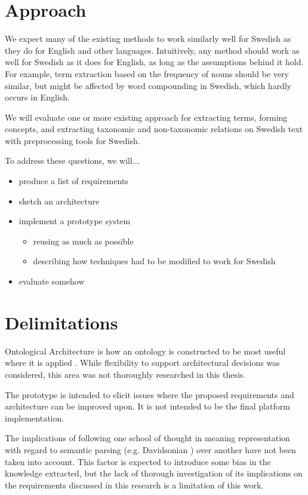 \documentclass[a4paper]{report}
\begin{document}
\section{Approach}

We expect many of the existing methods to work similarly well for Swedish as they do for English and other languages.
Intuitively, any method should work as well for Swedish as it does for English, as long as the assumptions behind it hold.
For example, term extraction based on the frequency of nouns should be very similar, but might be affected by word compounding in Swedish, which hardly occurs in English.

We will evaluate one or more existing approach for extracting terms, forming concepts, and extracting taxonomic and non-taxonomic relations on Swedish text with preprocessing tools for Swedish.


To address these questions, we will...

\begin{itemize}
  \item produce a list of requirements
  \item sketch an architecture
  \item implement a prototype system
    \begin{itemize}
      \item reusing as much as possible
      \item describing how techniques had to be modified to work for Swedish
    \end{itemize}
  \item evaluate somehow
\end{itemize}

\section{Delimitations}

Ontological Architecture is how an ontology is constructed to be most useful where it is applied \cite{OntArchChapter}. While flexibility to support architectural decisions was considered, this area was not thoroughly researched in this thesis.

The prototype is intended to elicit issues where the proposed requirements and architecture can be improved upon.
It is not intended to be the final platform implementation.

The implications of following one school of thought in meaning representation with regard to semantic parsing (e.g. Davidsonian \cite{DavidsonianSemantics}) over another have not been taken into account.
This factor is expected to introduce some bias in the knowledge extracted, but the lack of thorough investigation of its implications on the requirements discussed in this research is a limitation of this work.
\end{document}
